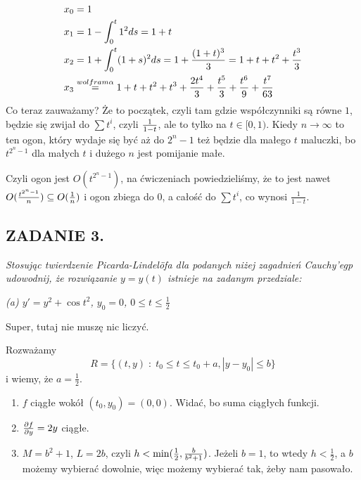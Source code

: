 \documentclass{article}
\begin{document}
\begin{align*}
    x_0&=1\\
    x_1&=1-\int_0^t1^2ds=1+t\\
    x_2&=1+\int_0^t(1+s)^2ds=1+{(1+t)^3\over 3}=1+t+t^2+{t^3\over 3}\\
    x_3&\overset{wolfram\alpha}{=}1+t+t^2+t^3+{2t^4\over 3}+{t^5\over3}+{t^6\over 9}+{t^7\over 63}
\end{align*}
Co teraz zauważamy? Że to początek, czyli tam gdzie współczynniki są równe $1$, będzie się zwijał do $\sum t^i$, czyli ${1\over 1-t}$, ale to tylko na $t\in[0, 1)$. Kiedy $n\to\infty$ to ten ogon, który wydaje się być aż do $2^n-1$ też będzie dla małego $t$ maluczki, bo $t^{2^n-1}$ dla małych $t$ i dużego $n$ jest pomijanie małe.

Czyli ogon jest $O(t^{2^n-1})$, na ćwiczeniach powiedzieliśmy, że to jest nawet $O({t^{2^n-1}\over n})\subseteq O(\frac1n)$ i ogon zbiega do $0$, a całość do $\sum t^i$, co wynosi $\frac1{1-t}$.


\subsection*{ZADANIE 3.}
\emph{\color{purple}Stosując twierdzenie Picarda-Lindel\"ofa dla podanych niżej zagadnień Cauchy'egp udowodnij, że rozwiązanie $y=y(t)$ istnieje na zadanym przedziale:}

\emph{\color{purple}(a) $y'=y^2+\cos t^2$, $y_0=0$, $0\leq t\leq\frac12$}

Super, tutaj nie muszę nic liczyć.

Rozważamy
$$R=\{(t,y)\;:\;t_0\leq t\leq t_0+a,|y-y_0|\leq b\}$$
i wiemy, że $a=\frac12$.

\begin{enumerate}
    \item $f$ ciągłe wokół $(t_0, y_0)=(0, 0)$. Widać, bo suma ciągłych funkcji.
    \item ${\partial f\over\partial y}=2y$ ciągłe.
    \item $M=b^2+1$, $L=2b$, czyli $h<\min(\frac12, {b\over b^2+1})$. Jeżeli $b=1$, to wtedy $h<\frac12$, a $b$ możemy wybierać dowolnie, więc możemy wybierać tak, żeby nam pasowało.
\end{enumerate}
\end{document}
